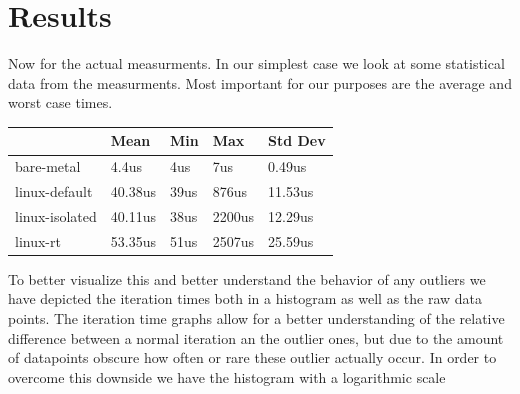\section{Results}
\label{sec:experiments:results}

Now for the actual measurments.
In our simplest case we look at some statistical data from the measurments.
Most important for our purposes are the average and worst case times.

\begin{table}[h!]
  \label{tab:measurments}
  \begin{tabular}{|l|l|l|l|l|}
    \hline
                   & Mean    & Min  & Max    & Std Dev \\ \hline
    bare-metal     & 4.4us   & 4us  & 7us    & 0.49us  \\ \hline
    linux-default  & 40.38us & 39us & 876us  & 11.53us \\ \hline
    linux-isolated & 40.11us & 38us & 2200us & 12.29us \\ \hline
    linux-rt       & 53.35us & 51us & 2507us & 25.59us \\ \hline
  \end{tabular}
\end{table}

To better visualize this and better understand the behavior of any outliers we have depicted the iteration times both in a histogram as well as the raw data points.
The iteration time graphs allow for a better understanding of the relative difference between a normal iteration an the outlier ones, but due to the amount of datapoints obscure how often or rare these outlier actually occur.
In order to overcome this downside we have the histogram with a logarithmic scale

\makeatletter
\newcommand{\includesvggraphics}[2][\textwidth]{
  \filename@parse{#2}%
  
}
\makeatother

